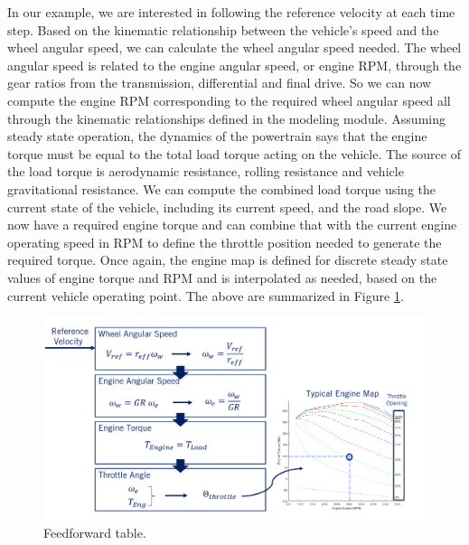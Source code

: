 In our example, we are interested in following
the reference velocity at each time step. Based on the kinematic relationship
between the vehicle's speed and the wheel angular speed, we can calculate
the wheel angular speed needed. The wheel angular speed is related
to the engine angular speed, or engine RPM, through the gear
ratios from the transmission, differential and final drive. So we can now compute the engine RPM corresponding to the required wheel angular speed all through the kinematic relationships
defined in the modeling module. Assuming steady state operation,
the dynamics of the powertrain says that the engine torque must be equal to the
total load torque acting on the vehicle. The source of the load torque
is aerodynamic resistance, rolling resistance and
vehicle gravitational resistance. We can compute the combined load torque
using the current state of the vehicle, including its current speed,
and the road slope. We now have a required engine torque and can combine that with the current
engine operating speed in RPM to define the throttle position needed
to generate the required torque. Once again, the engine map is defined for discrete steady state values
of engine torque and RPM and is interpolated as needed, based
on the current vehicle operating point. The above are summarized in Figure \ref{feedforward_table}.


\begin{figure}[!htb]
\begin{center}
\includegraphics[scale=0.380]{img/longitudinal_control/feedforward_table.jpeg}
\end{center}
\caption{Feedforward table.}
\label{feedforward_table}
\end{figure}

